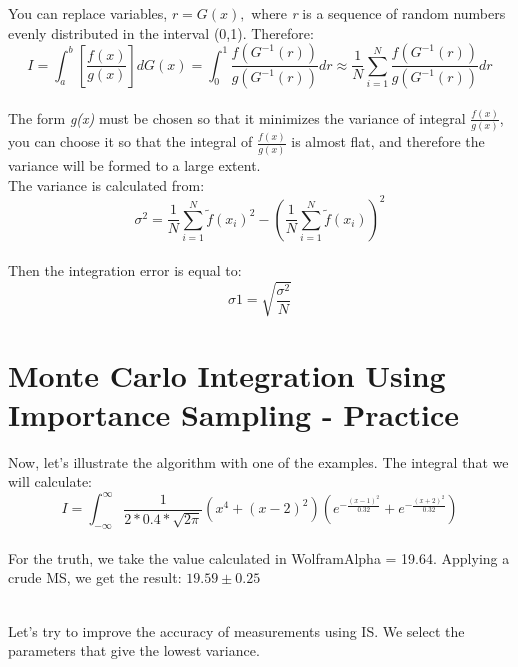 \documentclass{article}
\begin{document}
You can replace variables, ${r=G(x),}$ where \textit{r} is a sequence of random numbers evenly distributed in the interval (0,1). Therefore:
\newline
    \begin{equation}\label{eq:fourierrow}
        I=\int_{a}^{b}[\frac{f(x)}{g(x)}]dG(x)=\int_{0}^{1}\frac{f(G^{-1}(r))}{g(G^{-1}(r))}dr \approx \frac{1}{N}\sum_{i=1}^{N}\frac{f(G^{-1}(r))}{g(G^{-1}(r))}dr
    \end{equation}\\

The form \textit{g(x)} must be chosen so that it minimizes the variance of integral ${\frac{f(x)}{g(x)}}$, you can choose it so that the integral of ${\frac{f(x)}{g(x)}}$ is almost flat, and therefore the variance will be formed to a large extent.\\

The variance is calculated from:
\newline
    \begin{equation}\label{eq:fourierrow}
        \sigma^2=\frac{1}{N}\sum_{i=1}^{N}\widetilde{f}(x_{i})^2-(\frac{1}{N}\sum_{i=1}^{N}\widetilde{f}(x_{i}))^2
    \end{equation}\\

Then the integration error is equal to:
\newline
    \begin{equation}\label{eq:fourierrow}
        \sigma1=\sqrt{\frac{\sigma^2}{N}}
    \end{equation}
\newline
\section{Monte Carlo Integration Using Importance Sampling - Practice}
Now, let's illustrate the algorithm with one of the examples.
The integral that we will calculate:
\newline
	\begin{equation}\label{eq:fourierrow}
		I = \int_{-\infty}^{\infty}\frac{1}{2*0.4*\sqrt{2\pi}}(x^4+{(x-2)}^2)(e^{-\frac{{(x-1)}^2}{0.32}}+e^{-\frac{{(x+2)}^2}{0.32}})
	\end{equation}\\

For the truth, we take the value calculated in WolframAlpha = 19.64. Applying a crude MS, we get the result: ${19.59 \pm 0.25}$
\newline
\begin{figure}[h!]
\end{figure}\\

Let's try to improve the accuracy of measurements using IS. We select the parameters that give the lowest variance.
\newline
\begin{figure}[h!]
\end{figure}
\end{document}
